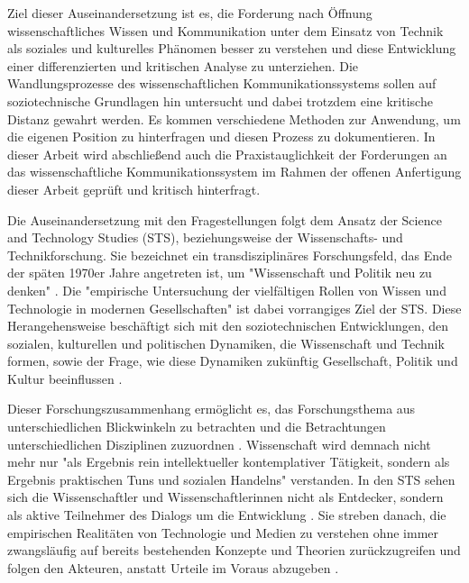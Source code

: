 Ziel dieser Auseinandersetzung ist es, die Forderung nach Öffnung wissenschaftliches Wissen und Kommunikation unter dem Einsatz von Technik als soziales und kulturelles Phänomen besser zu verstehen und diese Entwicklung einer differenzierten und kritischen Analyse zu unterziehen. Die Wandlungsprozesse des wissenschaftlichen Kommunikationssystems sollen auf soziotechnische Grundlagen hin untersucht und dabei trotzdem eine kritische Distanz gewahrt werden. Es kommen verschiedene Methoden zur Anwendung, um die eigenen Position zu hinterfragen und diesen Prozess zu dokumentieren. In dieser Arbeit wird abschließend auch die Praxistauglichkeit der Forderungen an das wissenschaftliche Kommunikationssystem im Rahmen der offenen Anfertigung dieser Arbeit geprüft und kritisch hinterfragt.

Die Auseinandersetzung mit den Fragestellungen folgt dem Ansatz der Science and Technology Studies (STS), beziehungsweise der Wissenschafts- und Technikforschung. Sie bezeichnet ein transdisziplinäres Forschungsfeld, das Ende der späten 1970er Jahre angetreten ist, um "Wissenschaft und Politik neu zu denken" \cite{Potthast_2010}. Die "empirische Untersuchung der vielfältigen Rollen von Wissen und Technologie in modernen Gesellschaften" \cite{beck_2014_science} ist dabei vorrangiges Ziel der STS. Diese Herangehensweise beschäftigt sich mit den soziotechnischen Entwicklungen, den sozialen, kulturellen und politischen Dynamiken, die Wissenschaft und Technik formen, sowie der Frage, wie diese Dynamiken zukünftig Gesellschaft, Politik und Kultur beeinflussen \cite{Potthast_2010} \cite{Brown_2014}.

Dieser Forschungszusammenhang ermöglicht es, das Forschungsthema aus unterschiedlichen Blickwinkeln zu betrachten und die Betrachtungen unterschiedlichen Disziplinen zuzuordnen \cite{beck_2014_science}  \cite{Potthast_2010}. Wissenschaft wird demnach nicht mehr nur "als Ergebnis rein intellektueller kontemplativer Tätigkeit, sondern als Ergebnis praktischen Tuns und sozialen Handelns" \cite{beck_2014_science} verstanden. In den STS sehen sich die Wissenschaftler und Wissenschaftlerinnen nicht als Entdecker, sondern als aktive Teilnehmer des Dialogs um die Entwicklung \cite{MacKenzie_STS_1999}. Sie streben danach, die empirischen Realitäten von Technologie und Medien zu verstehen \cite{kelty_2014_freedom} ohne immer zwangsläufig auf bereits bestehenden Konzepte und Theorien zurückzugreifen \cite[:8]{Brown_2014} und folgen den Akteuren, anstatt Urteile im Voraus abzugeben \cite[:584]{Irwin_2008}.

